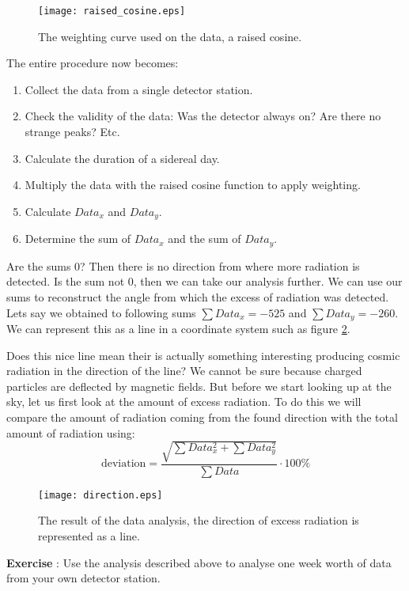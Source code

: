 \begin{figure}\begin{center}
\texttt{[image: raised\_cosine.eps]}
\caption{The weighting curve used on the data, a raised cosine.}\label{fig:raised_cosine}
\end{center}\end{figure} 

The entire procedure now becomes:
\begin{enumerate}[1.]
\item Collect the data from a single detector station.
\item Check the validity of the data: Was the detector always on? Are there no strange peaks? Etc.
\item Calculate the duration of a sidereal day.
\item Multiply the data with the raised cosine function to apply weighting.
\item Calculate $Data_x$ and $Data_y$.
\item Determine the sum of $Data_x$ and the sum of $Data_y$.
\end{enumerate}
Are the sums 0? Then there is no direction from where more radiation is detected. Is the sum not 0, then we can take our analysis further. We can use our sums to reconstruct the angle from which the excess of radiation was detected. Lets say we obtained to following sums $\sum Data_x = -525$  and $\sum Data_y = -260$. We can represent this as a line in a coordinate system such as figure \ref{fig:direction}. 

Does this nice line mean their is actually something interesting producing cosmic radiation in the direction of the line? We cannot be sure because charged particles are deflected by magnetic fields. But before we start looking up at the sky, let us first look at the amount of excess radiation. To do this we will compare the amount of radiation coming from the found direction with the total amount of radiation using:
\begin{equation} \mbox{deviation} = \frac{\sqrt{\sum Data_x^2 + \sum Data_y ^2}}{\sum Data} \cdot 100\% \end{equation}

\begin{figure}\begin{center}
\texttt{[image: direction.eps]}
\caption{The result of the data analysis, the direction of excess radiation is represented as a line.}\label{fig:direction}
\end{center}\end{figure} 

\begin{shaded}
\textbf{Exercise \theExercise {}} : Use the analysis described above to analyse one week worth of data from your own detector station.\end{shaded}




